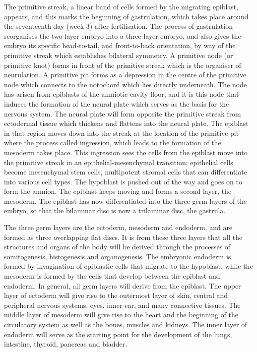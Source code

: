 The primitive streak, a linear band of cells formed by the migrating epiblast, appears, and this marks the beginning of gastrulation, which takes place around the seventeenth day (week 3) after fertilisation. The process of gastrulation reorganises the two-layer embryo into a three-layer embryo, and also gives the embryo its specific head-to-tail, and front-to-back orientation, by way of the primitive streak which establishes bilateral symmetry. A primitive node (or primitive knot) forms in front of the primitive streak which is the organiser of neurulation. A primitive pit forms as a depression in the centre of the primitive node which connects to the notochord which lies directly underneath. The node has arisen from epiblasts of the amniotic cavity floor, and it is this node that induces the formation of the neural plate which serves as the basis for the nervous system. The neural plate will form opposite the primitive streak from ectodermal tissue which thickens and flattens into the neural plate. The epiblast in that region moves down into the streak at the location of the primitive pit where the process called ingression, which leads to the formation of the mesoderm takes place. This ingression sees the cells from the epiblast move into the primitive streak in an epithelial-mesenchymal transition; epithelial cells become mesenchymal stem cells, multipotent stromal cells that can differentiate into various cell types. The hypoblast is pushed out of the way and goes on to form the amnion. The epiblast keeps moving and forms a second layer, the mesoderm. The epiblast has now differentiated into the three germ layers of the embryo, so that the bilaminar disc is now a trilaminar disc, the gastrula.

The three germ layers are the ectoderm, mesoderm and endoderm, and are formed as three overlapping flat discs. It is from these three layers that all the structures and organs of the body will be derived through the processes of somitogenesis, histogenesis and organogenesis. The embryonic endoderm is formed by invagination of epiblastic cells that migrate to the hypoblast, while the mesoderm is formed by the cells that develop between the epiblast and endoderm. In general, all germ layers will derive from the epiblast. The upper layer of ectoderm will give rise to the outermost layer of skin, central and peripheral nervous systems, eyes, inner ear, and many connective tissues. The middle layer of mesoderm will give rise to the heart and the beginning of the circulatory system as well as the bones, muscles and kidneys. The inner layer of endoderm will serve as the starting point for the development of the lungs, intestine, thyroid, pancreas and bladder.



